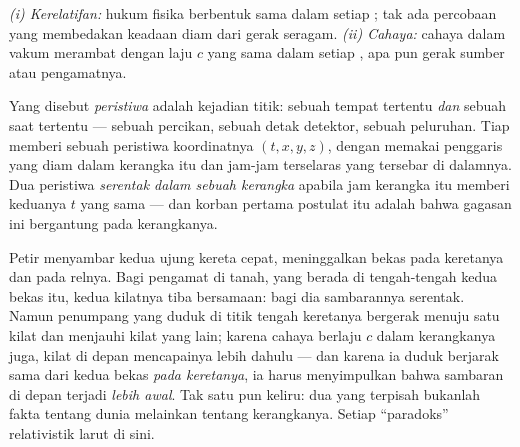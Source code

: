 \begin{theorem}\label{thm:b3:relativistic-kinematics:postulates}
\emph{(i) Kerelatifan:} hukum fisika berbentuk sama dalam setiap
; tak ada percobaan yang membedakan keadaan diam dari
gerak seragam. \emph{(ii) Cahaya:} cahaya dalam vakum merambat dengan
laju $c$ yang sama dalam setiap , apa pun gerak sumber
atau pengamatnya.
\end{theorem}
\admitted

\begin{definition}\label{def:b3:relativistic-kinematics:event}
Yang disebut \emph{peristiwa} adalah kejadian titik: sebuah tempat
tertentu \emph{dan} sebuah saat tertentu --- sebuah percikan, sebuah
detak detektor, sebuah peluruhan. Tiap  memberi sebuah
peristiwa koordinatnya $(t, x, y, z)$, dengan memakai penggaris yang
diam dalam kerangka itu dan jam-jam terselaras yang tersebar di
dalamnya. Dua peristiwa \emph{serentak dalam sebuah kerangka} apabila
jam kerangka itu memberi keduanya $t$ yang sama --- dan korban pertama
postulat itu adalah bahwa gagasan ini bergantung pada kerangkanya.
\end{definition}

\begin{example}\label{ex:b3:relativistic-kinematics:train}
Petir menyambar kedua ujung kereta cepat, meninggalkan bekas pada
keretanya dan pada relnya. Bagi pengamat di tanah, yang berada di
tengah-tengah kedua bekas itu, kedua kilatnya tiba bersamaan: bagi dia
sambarannya serentak. Namun penumpang yang duduk di titik tengah
keretanya bergerak menuju satu kilat dan menjauhi kilat yang lain;
karena cahaya berlaju $c$ dalam kerangkanya juga, kilat di depan
mencapainya lebih dahulu --- dan karena ia duduk berjarak sama dari
kedua bekas \emph{pada keretanya}, ia harus menyimpulkan bahwa sambaran
di depan terjadi \emph{lebih awal}. Tak satu pun keliru: 
dua  yang terpisah bukanlah fakta tentang dunia melainkan
tentang kerangkanya. Setiap ``paradoks'' relativistik larut di sini.
\end{example}


